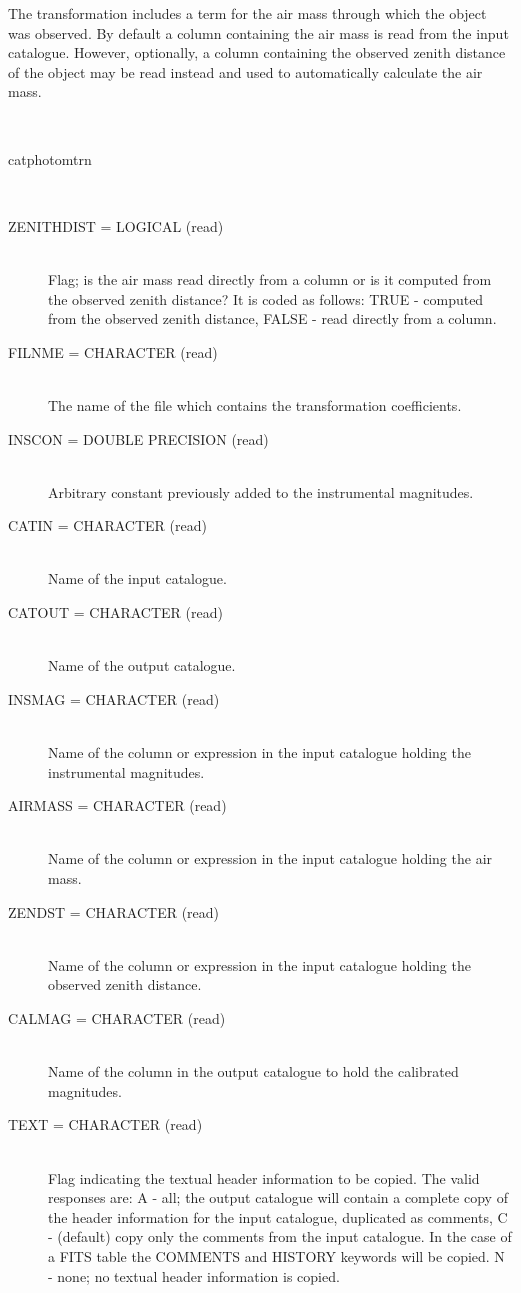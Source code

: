 \documentclass[twoside,11pt]{article}
\renewcommand{\_}{\texttt{\symbol{95}}}
\newcommand{\sstusage}[1]{\item[Usage:] \mbox{}
\\[1.3ex]{\raggedright \ssttt #1}}
\newcommand{\sstparameters}[1]{
   \item[Parameters:] \mbox{} \\
   \vspace{-3.5ex}
   \begin{description}
      #1
   \end{description}
}
\newcommand{\sstsubsection}[1]{ \item[{#1}] \mbox{} \\}
\newcommand{\sstusage}[1]{\item[Usage:]
      \begin{description}
         {\ssttt #1}
      \end{description}
      \\
   }
\newcommand{\sstparameters}[1]{
      \item[Parameters:] \\
      \begin{description}
         #1
      \end{description}
      \\
   }
\newcommand{\sstsubsection}[1]{\item[{#1}]}
\begin{document}
\begin{htmlonly}
{{      The transformation includes a term for the air mass through
      which the object was observed.  By default a column containing
      the air mass is read from the input catalogue.  However,
      optionally, a column containing the observed zenith distance
      of the object may be read instead and used to automatically
      calculate the air mass.
   }
   \sstusage{
      catphotomtrn
   }
   \sstparameters{
      \sstsubsection{
         ZENITHDIST  =  LOGICAL (read)
      }{
         Flag; is the air mass read directly from a column or is it
         computed from the observed zenith distance?  It is coded as
         follows:
         TRUE  - computed from the observed zenith distance,
         FALSE - read directly from a column.
      }
      \sstsubsection{
         FILNME  =  CHARACTER (read)
      }{
         The name of the file which contains the transformation
         coefficients.
      }
      \sstsubsection{
         INSCON  =  DOUBLE PRECISION (read)
      }{
         Arbitrary constant previously added to the instrumental
         magnitudes.
      }
      \sstsubsection{
         CATIN  =  CHARACTER (read)
      }{
         Name of the input catalogue.
      }
      \sstsubsection{
         CATOUT  =  CHARACTER (read)
      }{
         Name of the output catalogue.
      }
      \sstsubsection{
         INSMAG  =  CHARACTER (read)
      }{
         Name of the column or expression in the input catalogue
         holding the instrumental magnitudes.
      }
      \sstsubsection{
         AIRMASS  =  CHARACTER (read)
      }{
         Name of the column or expression in the input catalogue
         holding the air mass.
      }
      \sstsubsection{
         ZENDST  =  CHARACTER (read)
      }{
         Name of the column or expression in the input catalogue
         holding the observed zenith distance.
      }
      \sstsubsection{
         CALMAG  =  CHARACTER (read)
      }{
         Name of the column in the output catalogue to hold the
         calibrated magnitudes.
      }
      \sstsubsection{
         TEXT  =  CHARACTER (read)
      }{
         Flag indicating the textual header information to be copied.
         The valid responses are:
         A - all; the output catalogue will contain a complete copy
             of the header information for the input catalogue,
             duplicated as comments,
         C - (default) copy only the comments from the input catalogue.
             In the case of a FITS table the COMMENTS and HISTORY
             keywords will be copied.
         N - none; no textual header information is copied.
}}}
\end{htmlonly}
\end{document}
